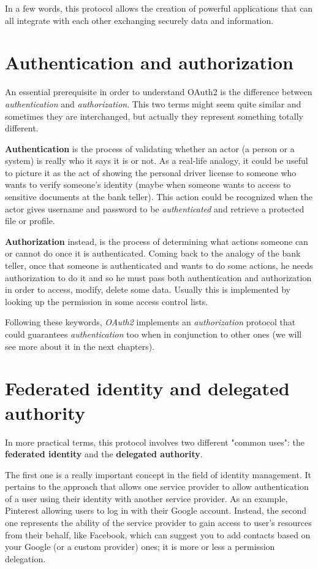 In a few words, this protocol allows the creation of powerful applications that can all integrate with each other exchanging securely data and information.

\vspace{0.5cm}

\section{Authentication and authorization}
An essential prerequisite in order to understand OAuth2 is the difference between \textit{authentication} and \textit{authorization}. This two terms might seem quite similar and sometimes they are interchanged, but actually they represent something totally different.

\textbf{Authentication} is the process of validating whether an actor (a person or a system) is really who it says it is or not.
As a real-life analogy, it could be useful to picture it as the act of showing the personal driver license to someone who wants to verify someone's identity (maybe when someone wants to access to sensitive documents at the bank teller). 
This action could be recognized when the actor gives username and password to be \textit{authenticated} and retrieve a protected file or profile.

\textbf{Authorization} instead, is the process of determining what actions someone can or cannot do once it is authenticated.
Coming back to the analogy of the bank teller, once that someone is authenticated and wants to do some actions, he needs authorization to do it and so he must pass both authentication and authorization in order to access, modify, delete some data. Usually this is implemented by looking up the permission in some access control lists.

Following these keywords, \textit{OAuth2} implements an \textit{authorization} protocol that could guarantees \textit{authentication} too when in conjunction to other ones (we will see more about it in the next chapters).

\section{Federated identity and delegated authority}
In more practical terms, this protocol involves two different "common uses": the \textbf{federated identity} and the \textbf{delegated authority}.

The first one is a really important concept in the field of identity management. It pertains to the approach that allows one service provider to allow authentication of a user using their identity with another service provider. As an example, Pinterest allowing users to log in with their Google account.
Instead, the second one represents the ability of the service provider to gain access to user's resources from their behalf, like Facebook, which can suggest you to add contacts based on your Google (or a custom provider) ones; it is more or less a permission delegation.

